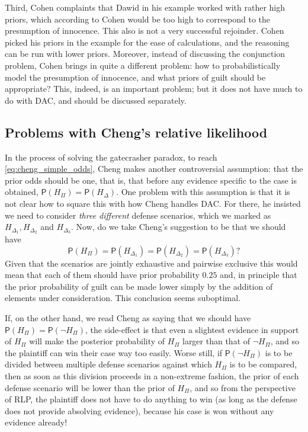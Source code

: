 \documentclass[10pt,dvipsnames,enabledeprecatedfontcommands]{scrartcl}
\newcommand{\n}{\neg}
\newcommand{\pr}[1]{\mathsf{P}(#1)}
\begin{document}
Third, Cohen complaints that Dawid in his example worked with rather
high priors, which according to Cohen would be too high to correspond to
the presumption of innocence. This also is not a very successful
rejoinder. Cohen picked his priors in the example for the ease of
calculations, and the reasoning can be run with lower priors. Moreover,
instead of discussing the conjunction problem, Cohen brings in quite a
different problem: how to probabilistically model the presumption of
innocence, and what priors of guilt should be appropriate? This, indeed,
is an important problem; but it does not have much to do with DAC, and
should be discussed separately.

\hypertarget{problems-with-chengs-relative-likelihood}{%
\subsection{Problems with Cheng's relative
likelihood}\label{problems-with-chengs-relative-likelihood}}

In the process of solving the gatecrasher paradox, to reach
\eqref{eq:cheng_simple_odds}, Cheng makes another controversial
assumption: that the prior odds should be one, that is, that before any
evidence specific to the case is obtained, \(\pr{H_\Pi}=\pr{H_\Delta}\).
One problem with this assumption is that it is not clear how to square
this with how Cheng handles DAC. For there, he insisted we need to
consider \emph{three different} defense scenarios, which we marked as
\(H_{\Delta_1}, H_{\Delta_2}\) and \(H_{\Delta_3}\). Now, do we take
Cheng's suggestion to be that we should have
\[\pr{H_\Pi}=\pr{H_{\Delta_1}}= \pr{H_{\Delta_2}}=\pr{H_{\Delta_3}}?\]
\noindent Given that the scenarios are jointly exhaustive and pairwise
exclusive this would mean that each of them should have prior
probability \(0.25\) and, in principle that the prior probability of
guilt can be made lower simply by the addition of elements under
consideration. This conclusion seems suboptimal.

If, on the other hand, we read Cheng as saying that we should have
\(\pr{H_\Pi}=\pr{\n H_\Pi}\), the side-effect is that even a slightest
evidence in support of \(H_\Pi\) will make the posterior probability of
\(H_\Pi\) larger than that of \(\n H_\Pi\), and so the plaintiff can win
their case way too easily. Worse still, if \(\pr{\n H_\Pi}\) is to be
divided between multiple defense scenarios against which \(H_\Pi\) is to
be compared, then as soon as this division proceeds in a non-extreme
fashion, the prior of each defense scenario will be lower than the prior
of \(H_\Pi\), and so from the perspective of RLP, the plaintiff does not
have to do anything to win (as long as the defense does not provide
absolving evidence), because his case is won without any evidence
already!
\end{document}
